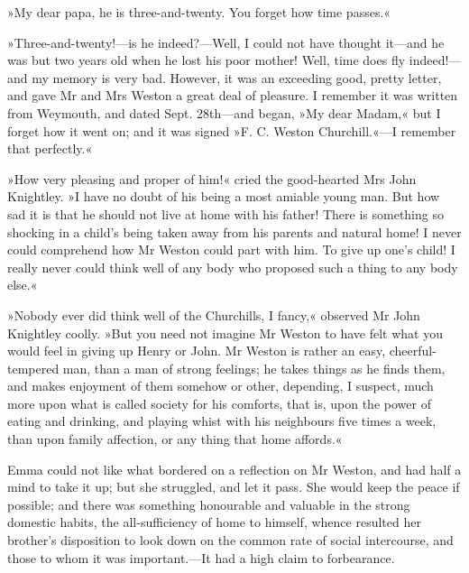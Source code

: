 »My dear papa, he is three-and-twenty. You forget how time passes.«

»Three-and-twenty!—is he indeed?—Well, I could not have thought it—and he was but two years old when he lost his poor mother! Well, time does fly indeed!—and my memory is very bad. However, it was an exceeding good, pretty letter, and gave Mr and Mrs Weston a great deal of pleasure. I remember it was written from Weymouth, and dated Sept. 28th—and began, »My dear Madam,« but I forget how it went on; and it was signed »F. C. Weston Churchill.«—I remember that perfectly.«

»How very pleasing and proper of him!« cried the good-hearted Mrs John Knightley. »I have no doubt of his being a most amiable young man. But how sad it is that he should not live at home with his father! There is something so shocking in a child's being taken away from his parents and natural home! I never could comprehend how Mr Weston could part with him. To give up one's child! I really never could think well of any body who proposed such a thing to any body else.«

»Nobody ever did think well of the Churchills, I fancy,« observed Mr John Knightley coolly. »But you need not imagine Mr Weston to have felt what you would feel in giving up Henry or John. Mr Weston is rather an easy, cheerful-tempered man, than a man of strong feelings; he takes things as he finds them, and makes enjoyment of them somehow or other, depending, I suspect, much more upon what is called society for his comforts, that is, upon the power of eating and drinking, and playing whist with his neighbours five times a week, than upon family affection, or any thing that home affords.«

Emma could not like what bordered on a reflection on Mr Weston, and had half a mind to take it up; but she struggled, and let it pass. She would keep the peace if possible; and there was something honourable and valuable in the strong domestic habits, the all-sufficiency of home to himself, whence resulted her brother's disposition to look down on the common rate of social intercourse, and those to whom it was important.—It had a high claim to forbearance.